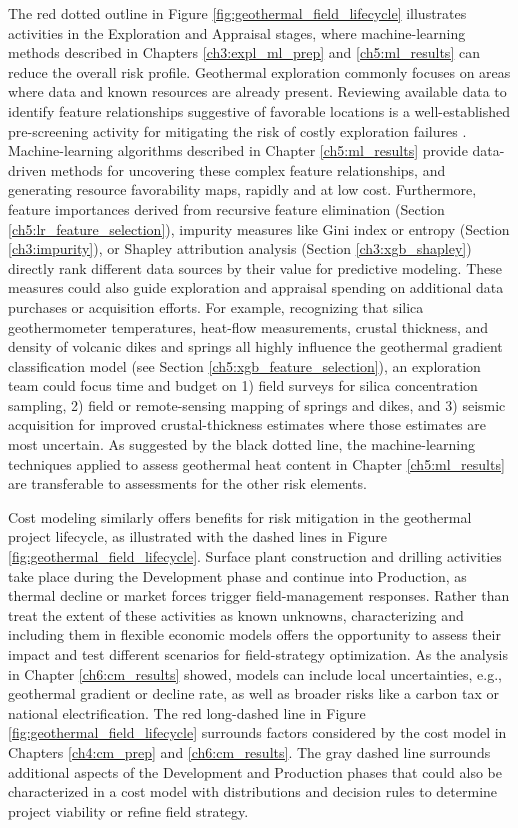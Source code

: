 The red dotted outline in Figure \ref{fig:geothermal_field_lifecycle} illustrates activities in the Exploration and Appraisal stages, where machine-learning methods described in Chapters \ref{ch3:expl_ml_prep} and \ref{ch5:ml_results} can reduce the overall risk profile. Geothermal exploration commonly focuses on areas where data and known resources are already present. Reviewing available data to identify feature relationships suggestive of favorable locations is a well-established pre-screening activity for mitigating the risk of costly exploration failures \citep{doughty_geovision_2018}. Machine-learning algorithms described in Chapter \ref{ch5:ml_results} provide data-driven methods for uncovering these complex feature relationships, and generating resource favorability maps, rapidly and at low cost. Furthermore, feature importances derived from recursive feature elimination (Section \ref{ch5:lr_feature_selection}), impurity measures like Gini index or entropy (Section \ref{ch3:impurity}), or Shapley attribution analysis (Section \ref{ch3:xgb_shapley}) directly rank different data sources by their value for predictive modeling. These measures could also guide exploration and appraisal spending on additional data purchases or acquisition efforts. For example, recognizing that silica geothermometer temperatures, heat-flow measurements, crustal thickness, and density of volcanic dikes and springs all highly influence the geothermal gradient classification model (see Section \ref{ch5:xgb_feature_selection}), an exploration team could focus time and budget on 1) field surveys for silica concentration sampling, 2) field or remote-sensing mapping of springs and dikes, and 3) seismic acquisition for improved crustal-thickness estimates where those estimates are most uncertain. As suggested by the black dotted line, the machine-learning techniques applied to assess geothermal heat content in Chapter \ref{ch5:ml_results} are transferable to assessments for the other risk elements. 

Cost modeling similarly offers benefits for risk mitigation in the geothermal project lifecycle, as illustrated with the dashed lines in Figure \ref{fig:geothermal_field_lifecycle}. Surface plant construction and drilling activities take place during the Development phase and continue into Production, as thermal decline or market forces trigger field-management responses. Rather than treat the extent of these activities as known unknowns, characterizing and including them in flexible economic models offers the opportunity to assess their impact and test different scenarios for field-strategy optimization. As the analysis in Chapter \ref{ch6:cm_results} showed, models can include local uncertainties, e.g., geothermal gradient or decline rate, as well as broader risks like a carbon tax or national electrification. The red long-dashed line in Figure \ref{fig:geothermal_field_lifecycle} surrounds factors considered by the cost model in Chapters \ref{ch4:cm_prep} and \ref{ch6:cm_results}. The gray dashed line surrounds additional aspects of the Development and Production phases that could also be characterized in a cost model with distributions and decision rules to determine project viability or refine field strategy.

